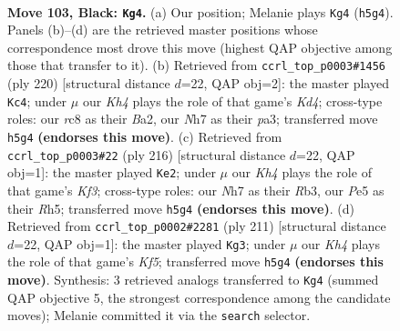 \documentclass[11pt]{article}
\begin{document}
\clearpage

\begin{figure}[p]\centering
\begin{subfigure}{0.46\textwidth}\centering
\resizebox{\linewidth}{!}{%
\newchessgame
\chessboard[
  setfen={2R5/6rn/7p/4p2k/7b/1K1p4/8/8 b - - 3 103},
  showmover=false,
  pgfstyle=straightmove, color=movearrow, markmove={h5-g4}
]}
\caption{}
\end{subfigure}\hfill
\begin{subfigure}{0.46\textwidth}\centering
\resizebox{\linewidth}{!}{%
\newchessgame
\chessboard[
  setfen={8/8/1k6/8/3K4/p1PP2b1/B7/8 w - - 0 111},
  showmover=false,
  pgfstyle=straightmove, color=movearrow, markmove={d4-c4}
]}
\caption{}
\end{subfigure}
\\[4pt]
\begin{subfigure}{0.46\textwidth}\centering
\resizebox{\linewidth}{!}{%
\newchessgame
\chessboard[
  setfen={8/8/r4k2/7R/5P2/1R3K2/5P2/6r1 w - - 69 109},
  showmover=false,
  pgfstyle=straightmove, color=movearrow, markmove={f3-e2}
]}
\caption{}
\end{subfigure}\hfill
\begin{subfigure}{0.46\textwidth}\centering
\resizebox{\linewidth}{!}{%
\newchessgame
\chessboard[
  setfen={8/1R6/8/5p2/r4k2/5p2/8/5K2 b - - 9 106},
  showmover=false,
  pgfstyle=straightmove, color=movearrow, markmove={f4-g3}
]}
\caption{}
\end{subfigure}
\caption{\textbf{Move 103, Black: \texttt{Kg4}.} (a) Our position; Melanie plays \texttt{Kg4} (\texttt{h5g4}). Panels (b)--(d) are the retrieved master positions whose correspondence most drove this move (highest QAP objective among those that transfer to it). (b) Retrieved from \texttt{ccrl\_top\_p0003\#1456} (ply 220) [structural distance $d$=22, QAP obj=2]: the master played \texttt{Kc4}; under $\mu$ our \emph{Kh4} plays the role of that game's \emph{Kd4}; cross-type roles: our \emph{r}c8 as their \emph{B}a2, our \emph{N}h7 as their \emph{p}a3; transferred move \texttt{h5g4} \textbf{(endorses this move)}. (c) Retrieved from \texttt{ccrl\_top\_p0003\#22} (ply 216) [structural distance $d$=22, QAP obj=1]: the master played \texttt{Ke2}; under $\mu$ our \emph{Kh4} plays the role of that game's \emph{Kf3}; cross-type roles: our \emph{N}h7 as their \emph{R}b3, our \emph{P}e5 as their \emph{R}h5; transferred move \texttt{h5g4} \textbf{(endorses this move)}. (d) Retrieved from \texttt{ccrl\_top\_p0002\#2281} (ply 211) [structural distance $d$=22, QAP obj=1]: the master played \texttt{Kg3}; under $\mu$ our \emph{Kh4} plays the role of that game's \emph{Kf5}; transferred move \texttt{h5g4} \textbf{(endorses this move)}. Synthesis: 3 retrieved analogs transferred to \texttt{Kg4} (summed QAP objective 5, the strongest correspondence among the candidate moves); Melanie committed it via the \texttt{search} selector.}
\label{fig:thought-m205}
\end{figure}
\end{document}
